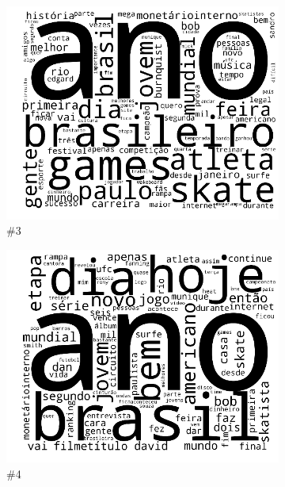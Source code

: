 \documentclass[
    12pt,                %
    oneside,            %
    a4paper,            %
    english,            %
    brazil                %
    ]{abntex2ppgsi}
\begin{document}
\begin{figure}[H]
\begin{subfigure}[b]{0.15\textwidth}
        \includegraphics[width=\textwidth]{img/ovnmtf-nc-2-tc-3.png}
        \caption{\#3}
    \end{subfigure}
    \begin{subfigure}[b]{0.15\textwidth}
        \includegraphics[width=\textwidth]{img/ovnmtf-nc-2-tc-4.png}
        \caption{\#4}
    \end{subfigure}
    \begin{subfigure}[b]{0.15\textwidth}

\end{subfigure}
\end{figure}
\end{document}
